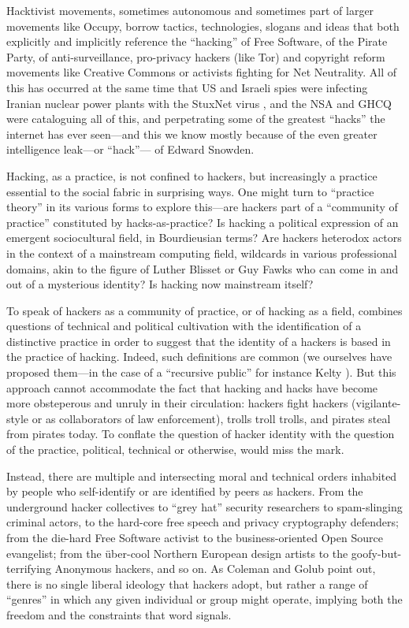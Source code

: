 \documentclass[10pt,letter,oneside]{scrartcl}
\begin{document}
Hacktivist movements, sometimes autonomous and sometimes part of larger
movements like Occupy, borrow tactics, technologies, slogans and ideas that both
explicitly and implicitly reference the ``hacking'' of Free Software, of the
Pirate Party, of anti-surveillance, pro-privacy hackers (like Tor) and copyright
reform movements like Creative Commons or activists fighting for Net
Neutrality. All of this has occurred at the same time that US and Israeli spies
were infecting Iranian nuclear power plants with the StuxNet virus
\autocite{zetter_countdown_2014}, and the NSA and GHCQ were cataloguing all of
this, and perpetrating some of the greatest ``hacks'' the internet has ever
seen---and this we know mostly because of the even greater intelligence
leak---or ``hack''--- of Edward Snowden.

Hacking, as a practice, is not confined to hackers, but increasingly a practice
essential to the social fabric in surprising ways.  One might turn to ``practice
theory'' in its various forms to explore this---are hackers part of a
``community of practice'' constituted by hacks-as-practice?  Is hacking a
political expression of an emergent sociocultural field, in Bourdieusian terms?
Are hackers heterodox actors in the context of a mainstream computing field,
wildcards in various professional domains, akin to the figure of Luther Blisset
or Guy Fawks who can come in and out of a mysterious identity?  Is hacking now
mainstream itself?

To speak of hackers as a community of practice, or of hacking as a field,
combines questions of technical and political cultivation with the
identification of a distinctive practice in order to suggest that the identity
of a hackers is based in the practice of hacking.  Indeed, such definitions are
common (we ourselves have proposed them---in the case of a ``recursive public''
for instance Kelty \parencite*{kelty_two_2008}).  But this approach cannot 
accommodate the fact that hacking and hacks have become more obsteperous 
and unruly in their circulation: hackers fight hackers (vigilante-style or
as collaborators of law enforcement), trolls troll trolls, and pirates steal 
from pirates today.  To conflate the question of hacker identity with the 
question of the practice, political, technical or otherwise, would miss the 
mark.

Instead, there are multiple and intersecting moral and technical orders 
inhabited by people who self-identify or are identified by peers as hackers. 
From the underground hacker collectives to ``grey hat'' security researchers 
to spam-slinging criminal actors, to the hard-core free speech and privacy 
cryptography defenders; from the die-hard Free Software activist to the 
business-oriented Open Source evangelist; from the über-cool Northern 
European design artists to the goofy-but-terrifying Anonymous hackers, 
and so on.  As Coleman and Golub \parencite*{coleman_hacker_2008} point out, 
there is no single liberal ideology that hackers adopt, but rather a 
range of ``genres'' in which any given individual or group might 
operate, implying both the freedom and the constraints that word signals.
\end{document}
